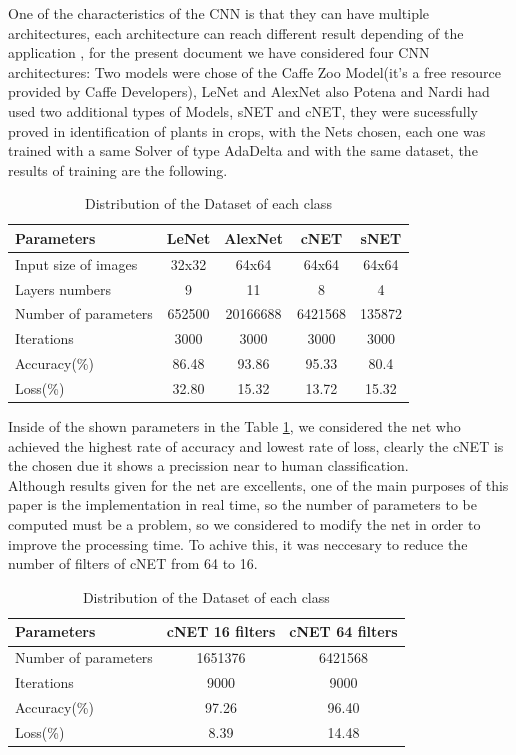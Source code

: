 \documentclass[conference]{IEEEtran}
\begin{document}
One of the characteristics of the CNN is that they can have multiple architectures, each architecture can reach different result depending of the application , for the present document we have considered four CNN architectures: Two models were chose of the Caffe Zoo Model(it's a free resource provided by Caffe Developers), LeNet and AlexNet also Potena and Nardi had used two additional types of Models, sNET and cNET, they were sucessfully proved in identification of plants in crops\cite{potena2016fast}, with the Nets chosen, each one was trained with a same Solver of type AdaDelta and with the same dataset, the results of training are the following. \\
\begin{table}[h!]
\centering
\begin{tabular}{|l c c c c|} 
 \hline
 \textbf{Parameters }& \textbf{LeNet} & \textbf{AlexNet} & \textbf{cNET} & \textbf{sNET} \\ [0.75ex] 
 \hline
 Input size of images & 32x32 & 64x64 & 64x64 & 64x64 \\ 
 Layers numbers & 9 & 11 & 8 & 4\\
 Number of parameters & 652500 & 20166688 & 6421568 & 135872 \\ 
 Iterations & 3000 & 3000 & 3000 & 3000 \\ 
  Accuracy(\%) & 86.48 & 93.86 & 95.33 & 80.4 \\
  Loss(\%) & 32.80 & 15.32 & 13.72 & 15.32 \\ [1ex] 
 \hline 
\end{tabular}
\caption{Distribution of the Dataset of each class}
\label{table:2}
\end{table}

Inside of the shown parameters in the Table \ref{table:2}, we considered the net who achieved the highest rate of accuracy and lowest rate of loss, clearly the cNET is the chosen due it shows a precission near to human classification.\\
	
Although results given for the net are excellents, one of the main purposes of this paper is the implementation in real time, so the number of parameters to be computed must be a problem, so we considered to modify the net in order to improve the processing time. To achive this, it was neccesary to reduce the number of filters of cNET from 64 to 16.\\

\begin{table}[h!]
\centering
\begin{tabular}{|l c c |} 
 \hline
 \textbf{Parameters} & \textbf{cNET 16 filters} & \textbf{cNET 64 filters} \\ [0.75ex] 
 \hline
 Number of parameters & 1651376 & 6421568 \\ 
 Iterations & 9000 & 9000  \\ 
  Accuracy(\%) & 97.26 & 96.40  \\
  Loss(\%) & 8.39 & 14.48  \\ [1ex] 
 \hline 
\end{tabular}
\caption{Distribution of the Dataset of each class}
\label{table:3}
\end{table}
\end{document}
